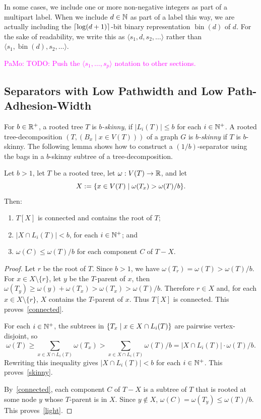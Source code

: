 \documentclass{patmorin}
\renewcommand{\ge}{\geqslant}
\renewcommand{\le}{\leqslant}
\newcommand{\pat}[1]{\noindent\textcolor{Magenta}{PaMo: #1}}
\newcommand{\defin}[1]{\emph{\textcolor{brightmaroon}{#1}}}
\DeclareMathOperator{\bin}{bin}
\DeclarePairedDelimiter{\set}{\{}{\}}
\DeclarePairedDelimiter{\ceil}{\lceil}{\rceil}
\begin{document}
  In some cases, we include one or more non-negative integers as part of a multipart label.  When we include $d\in\mathbb{N}$ as part of a label this way, we are actually including the $\ceil{\log(d+1)}$-bit binary representation \defin{$\bin(d)$} of $d$.  For the sake of readability, we write this as $\langle s_1,d,s_2,\ldots\rangle$ rather than $\langle s_1,\bin(d),s_2,\ldots\rangle$. \label{bin_d}

  \pat{TODO: Push the $\langle s_1,\ldots,s_p\rangle$ notation to other sections.}

  \subsection{Separators with Low Pathwidth and Low Path-Adhesion-Width}

  For $b\in\mathbb{R}^+$,
  a rooted tree $T$ is \defin{$b$-skinny},
  if $|L_i(T)|\le b$ for each $i\in\mathbb{N}^+$.  A rooted tree-decomposition $(T,(B_x\mid x\in V(T)))$ of a graph $G$ is \defin{$b$-skinny} if $T$ is $b$-skinny.  The following lemma shows how to construct a $(1/b)$-separator using the bags in a $b$-skinny subtree of a tree-decomposition.


  \begin{lem}\label{low_pathwidth_separator}
    Let $b>1$, let $T$ be a rooted tree, let $\omega:V(T)\to\mathbb{R}$, and let
    \[
    X:=\set{x\in V(T)\mid\omega(T_x)>\omega(T)/b}.
    \]
    Then:
    \begin{enumerate}[nosep,nolistsep,label=(\alph*)]
      \item\label{connected} $T[X]$ is connected and contains the root of $T$;
      \item\label{skinny} $|X\cap L_i(T)|< b$, for each $i\in\mathbb{N}^+$; and
      \item\label{light} $\omega(C)\le \omega(T)/b$ for each component $C$ of $T-X$.
    \end{enumerate}
  \end{lem}

  \begin{proof}
    Let $r$ be the root of $T$.  Since $b>1$, we have $\omega(T_r)=\omega(T)>\omega(T)/b$. %
    For $x\in X\setminus\{r\}$, let $y$ be the $T$-parent of $x$, then
    $\omega(T_y)\ge \omega(y)+\omega(T_x)>\omega(T_x)>\omega(T)/b$.
    Therefore $r\in X$ and, for each $x\in X\setminus\{r\}$, $X$ contains the $T$-parent of $x$. Thus $T[X]$ is connected.
    This proves~\ref{connected}.

    For each $i\in\mathbb{N}^+$, the subtrees in $\set{T_x \mid x\in X\cap L_i(T)}$ are pairwise vertex-disjoint, so
    \[
    \omega(T) \ge \sum_{x\in X\cap L_i(T)} \omega(T_x)> \sum_{x\in X\cap L_i(T)}\omega(T)/b = |X\cap L_i(T)|\cdot\omega(T)/b.
    \]
    Rewriting this inequality gives $|X\cap L_i(T)|<b$ for each $i\in\mathbb{N}^+$.
    This proves~\ref{skinny}.

    By~\ref{connected}, each component $C$ of $T-X$ is a subtree of $T$ that is rooted at some node $y$ whose $T$-parent is in $X$.  Since  $y\not\in X$, $\omega(C)=\omega(T_y)\le \omega(T)/b$.
    This proves~\ref{light}.
  \end{proof}
\end{document}
